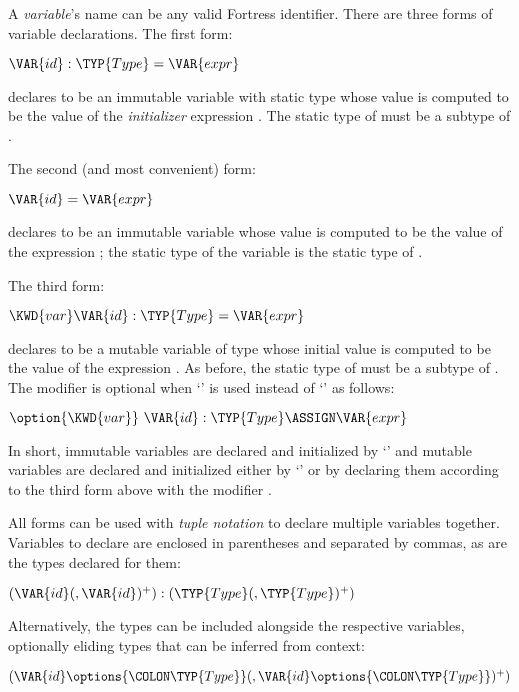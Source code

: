 A \emph{variable}'s name can be any valid Fortress identifier.
There are three forms of variable declarations.  The first form:
\begin{Fortress}
\(\VAR{id} \mathrel{\mathtt{:}} \TYP{Type} = \VAR{expr}\)
\end{Fortress}
declares  to be an immutable variable with static type 
whose value is computed to be the value of the \emph{initializer} expression
.
The static type of  must be a subtype of .


The second (and most convenient) form:
\begin{Fortress}
\(\VAR{id} = \VAR{expr}\)
\end{Fortress}
declares  to be an immutable variable
whose value is computed to be the value of the expression ;
the static type of the variable is the static type of .

The third form:
\begin{Fortress}
\(\KWD{var} \VAR{id} \mathrel{\mathtt{:}} \TYP{Type} = \VAR{expr}\)
\end{Fortress}
declares  to be a mutable variable of type 
whose initial value is computed to be the value of the expression .
As before, the static type of  must be a subtype of .
The modifier  is optional
when `\EXP{\ASSIGN}' is used instead of `\EXP{=}' as follows:

\begin{Fortress}
\(\option{\KWD{var}}\ \VAR{id} \mathrel{\mathtt{:}} \TYP{Type} \ASSIGN \VAR{expr}\)
\end{Fortress}

In short, immutable variables are declared and initialized by `\EXP{=}'
and mutable variables are declared and initialized either by `\EXP{\ASSIGN}'
or by declaring them according to the third form above with the modifier
.


All forms can be used with \emph{tuple notation} to declare multiple
variables together.  Variables to declare
are enclosed in parentheses and separated by commas, as are the
types declared for them:
\begin{Fortress}
\((\VAR{id}(, \VAR{id})^+) \mathrel{\mathtt{:}} (\TYP{Type}(, \TYP{Type})^+)\)
\end{Fortress}
Alternatively, the types can be included alongside the respective variables,
optionally eliding types that can be inferred from context:
\begin{Fortress}
\((\VAR{id}\options{\COLON \TYP{Type}}(, \VAR{id}\options{\COLON \TYP{Type}})^+)\)
\end{Fortress}

